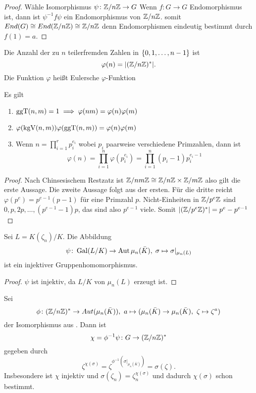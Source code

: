 \begin{proof}
    Wähle Isomorphismus \(\psi\colon \mathbb{Z}/n\mathbb{Z}\to G\) Wenn \(f\colon G\to G\) Endomorphismus ist, dann ist \(\psi^{-1}f\psi\) ein Endomorphismus von \(\mathbb{Z}/n\mathbb{Z}\).
    somit \(End(G)\cong End(\mathbb{Z}/n\mathbb{Z})\cong \mathbb{Z}/n\mathbb{Z}\) denn Endomorphismen eindeutig bestimmt durch \(f(1)=a\).
\end{proof}
\begin{Def}
   Die Anzahl der zu \(n\) teilerfremden Zahlen in \(\{0,1,\dots,n-1\}\) ist \[\varphi(n)=\lvert(\mathbb{Z}/n\mathbb{Z})^*\rvert.\] Die Funktion \(\varphi\) heißt Eulersche \(\varphi\)-Funktion
\end{Def}
\begin{Lemma} Es gilt
    \begin{enumerate}
        \item  \(\operatorname{ggT}(n,m)=1\implies \varphi(nm)=\varphi(n)\varphi(m)\)
        \item \(\varphi(\operatorname{kgV}(n,m))\varphi(\operatorname{ggT}(n,m))=\varphi(n)\varphi(m)\)
        \item Wenn \(n=\prod_{i=1}^rp_i^{e_i}\) wobei \(p_i\) paarweise verschiedene Primzahlen, dann ist 
        \[\varphi(n)=\prod_{i=1}^n\varphi(p_i^{e_i})=\prod_{i=1}^n(p_i-1)p_i^{e_i-1}\]
    \end{enumerate}
\end{Lemma}
\begin{proof}
    Nach Chinsesischem Restzatz ist \(\mathbb{Z}/nm\mathbb{Z}\cong \mathbb{Z}/n\mathbb{Z}\times \mathbb{Z}/m\mathbb{Z}\) also gilt die erste Aussage. Die zweite Aussage folgt aus der ersten.
    Für die dritte reicht \(\varphi(p^e)=p^{e-1}(p-1)\) für eine Primzahl \(p\).
    Nicht-Einheiten in \(\mathbb{Z}/p^e\mathbb{Z}\) sind \(0,p,2p,\dots,(p^{e-1}-1)p\), das sind also \(p^{e-1}\) viele. Somit \(|(\mathbb{Z}/p^e\mathbb{Z})^*|=p^e-p^{e-1}\)
\end{proof}
\begin{Satz}
    Sei \(L=K(\zeta_n)/K\). Die Abbildung 
    \[\psi\colon\operatorname{Gal}(L/K)\to\operatorname{Aut}\mu_n(\bar K),\; \sigma\mapsto \sigma|_{\mu_n(L)}\] ist ein injektiver Gruppenhomomorphismus.
\end{Satz}
\begin{proof}
    \(\psi\) ist injektiv, da \(L/K\) von \(\mu_n(L)\) erzeugt ist.
\end{proof}
\begin{Kor}\label{Kor:ChiGal}
    Sei \[\phi\colon(\ZZ/n\ZZ)^*\to Aut(\mu_n(\bar K)),\ a\mapsto (\mu_n(\bar K)\to\mu_n(\bar K),\ \zeta\mapsto \zeta^a)\] der Isomorphismus aus .
    Dann ist \[\chi=\phi^{-1}\psi\colon G\to (\mathbb{Z}/n\mathbb{Z})^* \] gegeben durch \[\zeta^{\chi(\sigma)}=\zeta^{\phi^{-1}(\sigma|_{\mu_n(\bar K)})}=\sigma(\zeta).\]
    Insbesondere ist \(\chi\) injektiv und \(\sigma(\zeta_n)=\zeta_n^{\chi(\sigma)}\) und dadurch \(\chi(\sigma)\) schon bestimmt.
\end{Kor}
